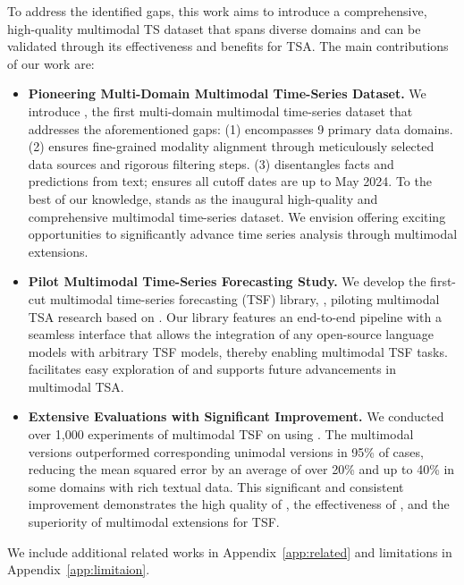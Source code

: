 To address the identified gaps, this work aims to introduce a comprehensive, high-quality multimodal TS dataset that spans diverse domains and can be validated through its effectiveness and benefits for TSA. The main contributions of our work are:
\begin{itemize}
    \item \textbf{Pioneering Multi-Domain Multimodal Time-Series Dataset.} We introduce \model, the first multi-domain multimodal time-series dataset that addresses the aforementioned gaps: (1) encompasses 9 primary data domains. (2) ensures fine-grained modality alignment through meticulously selected data sources and rigorous filtering steps. (3) disentangles facts and predictions from text; ensures all cutoff dates are up to May 2024. To the best of our knowledge, \model stands as the inaugural high-quality and comprehensive multimodal time-series dataset. We envision \model offering exciting opportunities to significantly advance time series analysis through multimodal extensions.
    \item \textbf{Pilot Multimodal Time-Series Forecasting Study.} We develop the first-cut multimodal time-series forecasting (TSF) library, \mmtsf, piloting multimodal TSA research based on \model. Our library \mmtsf features an end-to-end pipeline with a seamless interface that allows the integration of any open-source language models with arbitrary TSF models, thereby enabling multimodal TSF tasks. \mmtsf facilitates easy exploration of \model and supports future advancements in multimodal TSA.
    \item \textbf{Extensive Evaluations with Significant Improvement.} We conducted over 1,000 experiments of multimodal TSF on \model using \mmtsf. The multimodal versions outperformed corresponding unimodal versions in 95\% of cases, reducing the mean squared error by an average of over 20\% and up to 40\% in some domains with rich textual data. This significant and consistent improvement demonstrates the high quality of \model, the effectiveness of \mmtsf, and the superiority of multimodal extensions for TSF.
\end{itemize}
We include additional related works in Appendix~\ref{app:related} and limitations in Appendix~\ref{app:limitaion}.
